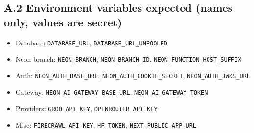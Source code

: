 \documentclass[12pt]{article}
\begin{document}
\subsection*{A.2 Environment variables expected (names only, values are secret)}
\begin{itemize}
\item Database: \texttt{DATABASE\_URL}, \texttt{DATABASE\_URL\_UNPOOLED}
\item Neon branch: \texttt{NEON\_BRANCH}, \texttt{NEON\_BRANCH\_ID}, \texttt{NEON\_FUNCTION\_HOST\_SUFFIX}
\item Auth: \texttt{NEON\_AUTH\_BASE\_URL}, \texttt{NEON\_AUTH\_COOKIE\_SECRET}, \texttt{NEON\_AUTH\_JWKS\_URL}
\item Gateway: \texttt{NEON\_AI\_GATEWAY\_BASE\_URL}, \texttt{NEON\_AI\_GATEWAY\_TOKEN}
\item Providers: \texttt{GROQ\_API\_KEY}, \texttt{OPENROUTER\_API\_KEY}
\item Misc: \texttt{FIRECRAWL\_API\_KEY}, \texttt{HF\_TOKEN}, \texttt{NEXT\_PUBLIC\_APP\_URL}
\end{itemize}
\end{document}
